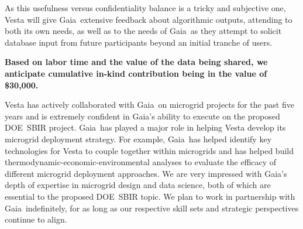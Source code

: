 \documentclass{vestaletter}
\def\BidderShort{Gaia}
\def\FunderAcronym{DOE}
\begin{document}
As this usefulness versus confidentiality balance is a tricky and subjective one, Vesta will give \BidderShort\ extensive feedback about algorithmic outputs, attending to both its own needs, as well as to the needs of \BidderShort\ as they attempt to solicit database input from future participants beyond an initial tranche of users.

\textbf{Based on labor time and the value of the data being shared, we anticipate cumulative in-kind contribution being in the value of \$30,000.}

Vesta has actively collaborated with \BidderShort\ on microgrid projects for the past five years and is extremely confident in \BidderShort’s ability to execute on the proposed \FunderAcronym\ SBIR project. \BidderShort\ has played a major role in helping Vesta develop its microgrid deployment strategy. For example, \BidderShort\ has helped identify key technologies for Vesta to couple together within microgrids and has helped build thermodynamic-economic-environmental analyses to evaluate the efficacy of different microgrid deployment approaches.  We are very impressed with \BidderShort's depth of expertise in microgrid design and data science, both of which are essential to the proposed \FunderAcronym\ SBIR topic. We plan to work in partnership with \BidderShort\ indefinitely, for as long as our respective skill sets and strategic perspectives continue to align.
\end{document}
